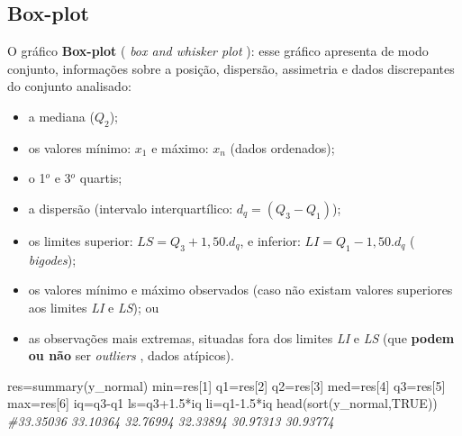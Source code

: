 \documentclass[
]{book}
\newenvironment{Shaded}{\begin{snugshade}}{\end{snugshade}}
\newcommand{\CommentTok}[1]{\textcolor[rgb]{0.56,0.35,0.01}{\textit{#1}}}
\newcommand{\ConstantTok}[1]{\textcolor[rgb]{0.00,0.00,0.00}{#1}}
\newcommand{\DecValTok}[1]{\textcolor[rgb]{0.00,0.00,0.81}{#1}}
\newcommand{\FloatTok}[1]{\textcolor[rgb]{0.00,0.00,0.81}{#1}}
\newcommand{\FunctionTok}[1]{\textcolor[rgb]{0.00,0.00,0.00}{#1}}
\newcommand{\NormalTok}[1]{#1}
\newcommand{\OtherTok}[1]{\textcolor[rgb]{0.56,0.35,0.01}{#1}}
\newcommand{\SpecialCharTok}[1]{\textcolor[rgb]{0.00,0.00,0.00}{#1}}
\providecommand{\tightlist}{%
  \setlength{\itemsep}{0pt}\setlength{\parskip}{0pt}}
\begin{document}
\hfill\break

\hypertarget{box-plot}{%
\subsection{Box-plot}\label{box-plot}}

\hfill\break

O gráfico \textbf{Box-plot} ( \emph{box and whisker plot} ): esse gráfico apresenta de modo conjunto, informações sobre a posição, dispersão, assimetria e dados discrepantes do conjunto analisado:

\hfill\break

\begin{itemize}
\tightlist
\item
  a mediana (\(Q_{2}\));
\item
  os valores mínimo: \(x_{1}\) e máximo: \(x_{n}\) (dados ordenados);
\item
  o 1\(^{o}\) e 3\(^{o}\) quartis;
\item
  a dispersão (intervalo interquartílico: \(d_{q}=(Q_{3} - Q_{1})\));
\item
  os limites superior: \(LS=Q_{3} + 1,50.d_{q}\), e inferior: \(LI=Q_{1} - 1,50.d_{q}\) ( \emph{bigodes});
\item
  os valores mínimo e máximo observados (caso não existam valores superiores aos limites \emph{LI} e \emph{LS}); ou
\item
  as observações mais extremas, situadas fora dos limites \emph{LI} e \emph{LS} (que \textbf{podem ou não} ser \emph{outliers} , dados atípicos).
\end{itemize}

\hfill\break

\begin{Shaded}
\begin{Highlighting}[]
\NormalTok{res}\OtherTok{=}\FunctionTok{summary}\NormalTok{(y\_normal)}
\NormalTok{min}\OtherTok{=}\NormalTok{res[}\DecValTok{1}\NormalTok{]}
\NormalTok{q1}\OtherTok{=}\NormalTok{res[}\DecValTok{2}\NormalTok{]}
\NormalTok{q2}\OtherTok{=}\NormalTok{res[}\DecValTok{3}\NormalTok{]}
\NormalTok{med}\OtherTok{=}\NormalTok{res[}\DecValTok{4}\NormalTok{]}
\NormalTok{q3}\OtherTok{=}\NormalTok{res[}\DecValTok{5}\NormalTok{]}
\NormalTok{max}\OtherTok{=}\NormalTok{res[}\DecValTok{6}\NormalTok{]}
\NormalTok{iq}\OtherTok{=}\NormalTok{q3}\SpecialCharTok{{-}}\NormalTok{q1}
\NormalTok{ls}\OtherTok{=}\NormalTok{q3}\FloatTok{+1.5}\SpecialCharTok{*}\NormalTok{iq}
\NormalTok{li}\OtherTok{=}\NormalTok{q1}\FloatTok{{-}1.5}\SpecialCharTok{*}\NormalTok{iq}
\FunctionTok{head}\NormalTok{(}\FunctionTok{sort}\NormalTok{(y\_normal,}\ConstantTok{TRUE}\NormalTok{)) }\CommentTok{\#33.35036 33.10364 32.76994 32.33894 30.97313 30.93774}
\end{Highlighting}
\end{Shaded}
\end{document}
